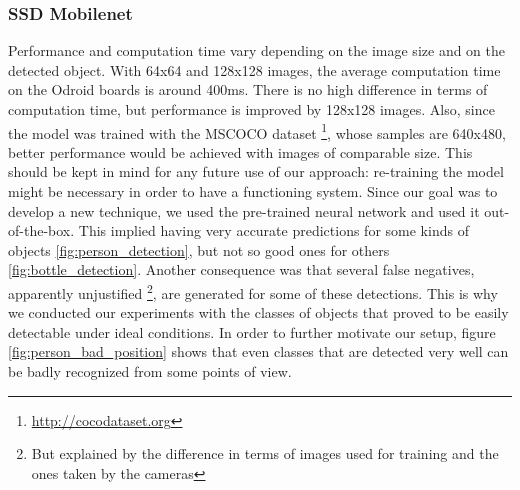 \documentclass[10pt,conference,compsocconf]{IEEEtran}
\begin{document}
\subsubsection{SSD Mobilenet}
\label{model:ssd}
Performance and computation time vary depending on the image size and on the detected object.
With 64x64 and 128x128 images, the average computation time on the Odroid boards is around 400ms. There is no high difference in terms of computation time, but performance is improved by 128x128 images. Also, since the model was trained with the MSCOCO dataset \footnote{\url{http://cocodataset.org}}, whose samples are 640x480, better performance would be achieved with images of comparable size.
This should be kept in mind for any future use of our approach: re-training the model might be necessary in order to have a functioning system.
Since our goal was to develop a new technique, we used the pre-trained neural network and used it out-of-the-box. This implied having very accurate predictions for some kinds of objects \ref{fig:person_detection}, but not so good ones for others \ref{fig:bottle_detection}. Another consequence was that several false negatives, apparently unjustified \footnote{But explained by the difference in terms of images used for training and the ones taken by the cameras}, are generated for some of these detections. This is why we conducted our experiments with the classes of objects that proved to be easily detectable under ideal conditions.
In order to further motivate our setup, figure \ref{fig:person_bad_position} shows that even classes that are detected very well can be badly recognized from some points of view.
\end{document}
